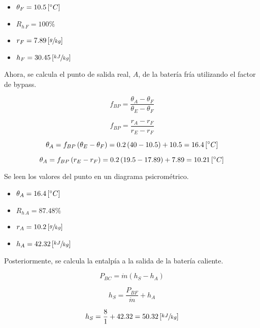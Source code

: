 \documentclass[11pt]{article}
\begin{document}
\begin{itemize}
    \item
    $ \theta _F = 10.5 \left[ \degree C \right] $

    \item
    $ R_{ h \, F } = 100\% $

    \item
    $ r_F = 7.89 \left[ \sfrac{ g }{ kg } \right] $

    \item
    $ h_F = 30.45 \left[ \sfrac{ kJ }{ kg } \right] $

\end{itemize}

Ahora, se calcula el punto de salida real, $ A $, de la batería fría utilizando el factor de bypass.

\[ f_{ BP } = \frac{ \theta _A - \theta _F }{ \theta _E - \theta _F } \]

\[ f_{ BP } = \frac{ r_A - r_F }{ r_E - r_F } \]

\[ \theta _A = f_{ BP } \left( \theta _E - \theta _F \right) = 0.2 \left( 40 - 10.5 \right) + 10.5 = 16.4 \left[ \degree C \right] \]

\[ \theta _A = f_{ BP } \left( r_E - r_F \right) = 0.2 \left( 19.5 - 17.89 \right) + 7.89 = 10.21 \left[ \degree C \right] \]

Se leen los valores del punto en un diagrama psicrométrico.

\begin{itemize}
    \item
    $ \theta _A = 16.4 \left[ \degree C \right] $

    \item
    $ R_{ h \, A } = 87.48\% $

    \item
    $ r_A = 10.2 \left[ \sfrac{ g }{ kg } \right] $

    \item
    $ h_A = 42.32 \left[ \sfrac{ kJ }{ kg } \right] $

\end{itemize}

Posteriormente, se calcula la entalpía a la salida de la batería caliente.

\[ P_{ BC } = \dot{ m } \left( h_S - h_A \right) \]

\[ h_S = \frac{ P_{ BF } }{ \dot{ m } } + h_A \]

\[ h_S = \frac{ 8 }{ 1 } + 42.32 = 50.32 \left[ \sfrac{ kJ }{ kg } \right] \]
\end{document}
